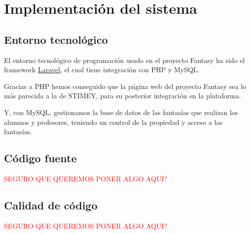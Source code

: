 \chapter{Implementación del sistema}
\section{Entorno tecnológico}
El entorno tecnológico de programación usado en el proyecto Fantasy ha sido el framework \href{https://laravel.com/}{Laravel}, el cual tiene integración con PHP y MySQL.

Gracias a PHP hemos conseguido que la página web del proyecto Fantasy sea lo más parecida a la de STIMEY, para su posterior integración en la plataforma.

Y, con MySQL, gestionamos la base de datos de las fantasías que realizan los alumnos y profesores, teniendo un control de la propiedad y acceso a las fantasías.

\section{Código fuente}
\textcolor{red}{SEGURO QUE QUEREMOS PONER ALGO AQUI?}

\section{Calidad de código}
\textcolor{red}{SEGURO QUE QUEREMOS PONER ALGO AQUI?}